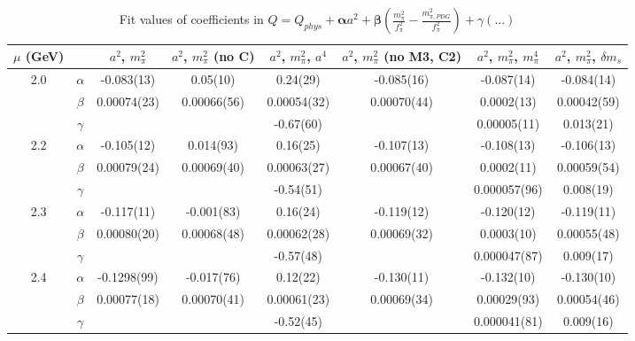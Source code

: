 \documentclass[12pt]{extarticle}
\begin{document}
\begin{table}[h!]
\begin{center}
\begin{tabular}{|c c|c|c|c|c|c|c|}
\hline
$\mu$ (GeV) &  & $a^2$, $m_\pi^2$& $a^2$, $m_\pi^2$ (no C)& $a^2$, $m_\pi^2$, $a^4$& $a^2$, $m_\pi^2$ (no M3, C2)& $a^2$, $m_\pi^2$, $m_\pi^4$& $a^2$, $m_\pi^2$, $\delta m_s$\\
\hline
\multirow{3}{0.5in}{2.0} & $\alpha$ & -0.083(13)& 0.05(10)& 0.24(29)& -0.085(16)& -0.087(14)& -0.084(14)\\
 & $\beta$ & 0.00074(23)& 0.00066(56)& 0.00054(32)& 0.00070(44)& 0.0002(13)& 0.00042(59)\\
 & $\gamma$ &  &  & -0.67(60)&  & 0.00005(11)& 0.013(21)\\
\hline
\multirow{3}{0.5in}{2.2} & $\alpha$ & -0.105(12)& 0.014(93)& 0.16(25)& -0.107(13)& -0.108(13)& -0.106(13)\\
 & $\beta$ & 0.00079(24)& 0.00069(40)& 0.00063(27)& 0.00067(40)& 0.0002(11)& 0.00059(54)\\
 & $\gamma$ &  &  & -0.54(51)&  & 0.000057(96)& 0.008(19)\\
\hline
\multirow{3}{0.5in}{2.3} & $\alpha$ & -0.117(11)& -0.001(83)& 0.16(24)& -0.119(12)& -0.120(12)& -0.119(11)\\
 & $\beta$ & 0.00080(20)& 0.00068(48)& 0.00062(28)& 0.00069(32)& 0.0003(10)& 0.00055(48)\\
 & $\gamma$ &  &  & -0.57(48)&  & 0.000047(87)& 0.009(17)\\
\hline
\multirow{3}{0.5in}{2.4} & $\alpha$ & -0.1298(99)& -0.017(76)& 0.12(22)& -0.130(11)& -0.132(10)& -0.130(10)\\
 & $\beta$ & 0.00077(18)& 0.00070(41)& 0.00061(23)& 0.00069(34)& 0.00029(93)& 0.00054(46)\\
 & $\gamma$ &  &  & -0.52(45)&  & 0.000041(81)& 0.009(16)\\
\hline
\end{tabular}
\caption{Fit values of coefficients in $Q = Q_{phys} + \mathbf{\alpha} a^2 + \mathbf{\beta}\left(\frac{m_\pi^2}{f_\pi^2}-\frac{m_{\pi,PDG}^2}{f_\pi^2}\right) + \gamma(\ldots)$}
\end{center}
\end{table}






\end{document}

